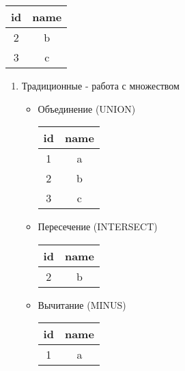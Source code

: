 \documentclass[a4paper, 14pt]{report}
\begin{document}
    \hfill

    \begin{tabular}{|c|c|}
        \hline
        id & name \\
        \hline
        2 & b \\
        \hline
        3 & c \\
        \hline
    \end{tabular}

    \begin{enumerate}
        \item Традиционные - работа с множеством

            \begin{itemize}
                \item Объединение (UNION)

                    \begin{tabular}{|c|c|}
                        \hline
                        id & name \\
                        \hline
                        1 & a \\
                        \hline
                        2 & b \\
                        \hline
                        3 & c \\
                        \hline
                    \end{tabular}

                \item Пересечение (INTERSECT)

                    \begin{tabular}{|c|c|}
                        \hline
                        id & name \\
                        \hline
                        2 & b \\
                        \hline
                    \end{tabular}

                \item Вычитание (MINUS)

                    \begin{tabular}{|c|c|}
                        \hline
                        id & name \\
                        \hline
                        1 & a \\
                        \hline 
                    \end{tabular}


\end{itemize}
\end{enumerate}
\end{document}
